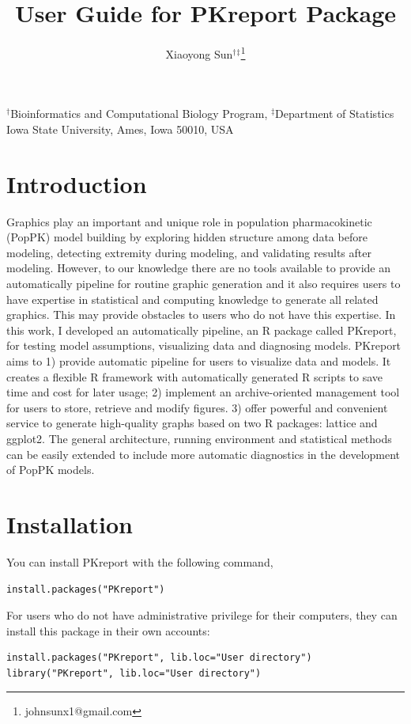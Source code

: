 \documentclass[a4paper]{article}
\author{Xiaoyong Sun$^\dagger$$^\ddagger$\footnote{johnsunx1@gmail.com}}
\begin{document}

\title{User Guide for PKreport Package}
\maketitle
\begin{center}$^\dagger$Bioinformatics and Computational Biology Program, $^\ddagger$Department of Statistics \\ Iowa State University, Ames, Iowa 50010, USA
\end{center}

\tableofcontents

\section{Introduction}

Graphics play an important and unique role in population pharmacokinetic (PopPK) model building by exploring hidden structure among data before modeling, detecting extremity during modeling, and validating results after modeling. However, to our knowledge there are no tools available to provide an automatically pipeline for routine graphic generation and it also requires users to have expertise in statistical and computing knowledge to generate all related graphics. This may provide obstacles to users who do not have this expertise. In this work, I developed an automatically pipeline, an R package called PKreport, for testing model assumptions, visualizing data and diagnosing models. PKreport aims to 1) provide automatic pipeline for users to visualize data and models. It creates a flexible R framework with automatically generated R scripts to save time and cost for later usage; 2) implement an archive-oriented management tool for users to store, retrieve and modify figures. 3) offer powerful and convenient service to generate high-quality graphs based on two R packages: lattice and ggplot2. The general architecture, running environment and statistical methods can be easily extended to include more automatic diagnostics in the development of PopPK models.

\section{Installation}
You can install PKreport with the following command,
\begin{verbatim}
install.packages("PKreport")
\end{verbatim}
For users who do not have administrative privilege for their computers, they can install this package in their own accounts:\begin{verbatim}
install.packages("PKreport", lib.loc="User directory")
library("PKreport", lib.loc="User directory")
\end{verbatim}
\end{document}

